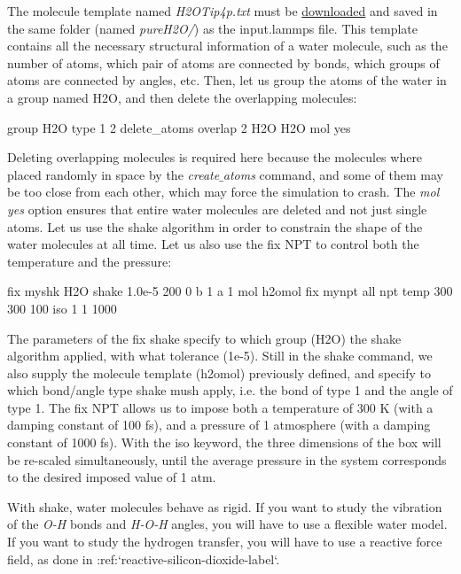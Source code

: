 \noindent The molecule template named \textit{H2OTip4p.txt} must be \href{../../../../../inputs/level2/polymer-in-water/pureH2O/H2OTip4p.txt}{downloaded}
and saved in the same folder (named \textit{pureH2O/}) as the
input.lammps file. This template contains all the necessary structural
information of a water molecule, such as the number of atoms, 
which pair of atoms are connected by bonds, which
groups of atoms are connected by angles, etc.
Then, let us group the atoms of the water in a group named
H2O, and then delete the overlapping molecules:

\begin{lcverbatim}
group H2O type 1 2
delete_atoms overlap 2 H2O H2O mol yes
\end{lcverbatim}

\noindent Deleting overlapping molecules is required here
because the molecules where placed randomly in space by
the \textit{create$\_$atoms} command, and some of them may be too
close from each other, which may force the simulation to
crash.
The \textit{mol yes} option ensures that entire water molecules are deleted and not just single atoms.
Let us use the shake algorithm in order to constrain the
shape of the water molecules at all time. Let us also use the fix NPT to
control both the temperature and the pressure:

\begin{lcverbatim}
fix myshk H2O shake 1.0e-5 200 0 b 1 a 1 mol h2omol
fix mynpt all npt temp 300 300 100 iso 1 1 1000
\end{lcverbatim}

\noindent The parameters of the fix shake specify to
which group (H2O) the shake algorithm applied, with what
tolerance (1e-5). Still in the shake command, we also supply
the molecule template (h2omol) previously defined, and
specify to which bond/angle type shake mush apply, i.e. the
bond of type 1 and the angle of type 1.
The fix NPT allows us to impose both a temperature of 300 K (with a damping constant of 100 fs),
and a pressure of 1 atmosphere (with a damping constant of 1000 fs). With the iso keyword, the
three dimensions of the box will be re-scaled simultaneously, until the average pressure in the system 
corresponds to the desired imposed value of 1 atm.

\begin{tcolorbox}[colback=mylightblue!5!white,colframe=mylightblue!75!black,title=About rigid water model]
With shake, water molecules behave as rigid. If
you want to study the vibration of the \textit{O-H} bonds and
\textit{H-O-H} angles, you will have to use a flexible water
model. If you want to study the hydrogen transfer, you
will have to use a reactive force field,
as done in :ref:`reactive-silicon-dioxide-label`.
\end{tcolorbox}

